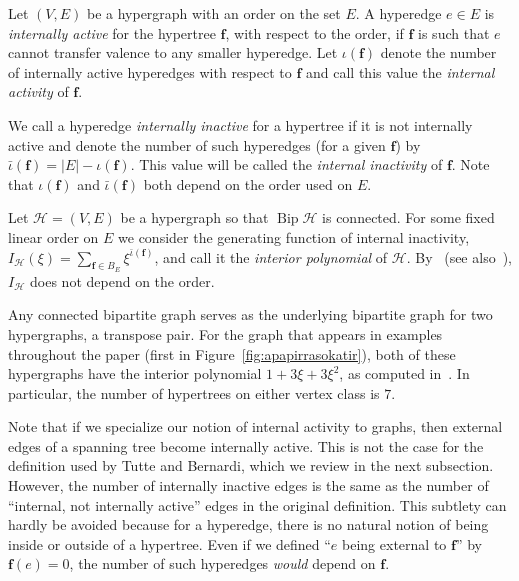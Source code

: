 \documentclass[ALCO,ThmDefs,Unicode,epreuves]{cedram}
\newcommand{\HH}{\mathcal H}
\DeclareMathOperator{\bip}{Bip}
\begin{document}
\begin{defi}
\label{def:activity}
Let $(V,E)$ be a hypergraph with an order on the set $E$. A hyperedge $e\in E$ is \emph{internally active} for the hypertree $\mathbf{f}$, with respect to the order, if $\mathbf f$ is such that $e$ cannot transfer valence to any smaller hyperedge. Let $\iota(\mathbf{f})$ denote the number of internally active hyperedges with respect to $\mathbf{f}$ and call this value the \emph{internal activity} of $\mathbf f$. 
\end{defi}

We call a hyperedge \emph{internally inactive} for a hypertree if it is not internally active and denote the number of such hyperedges (for a given $\mathbf{f}$) by $\bar\iota(\mathbf{f})=|E|-\iota(\mathbf{f})$. This value will be called the \emph{internal inactivity} of $\mathbf{f}$. Note that $\iota(\mathbf{f})$ and $\bar\iota(\mathbf{f})$ both depend on the order used on $E$.

\begin{defi}
\label{def:I}
Let $\HH=(V,E)$ be a hypergraph so that $\bip\HH$ is connected. For some fixed linear order on $E$ we consider the generating function of internal inactivity, $I_\HH(\xi)=\sum_{\mathbf{f}\in B_{E}} \xi^{\bar\iota(\mathbf{f})}$, and call it the \emph{interior polynomial} of $\HH$. By~\cite[Theorem~5.4]{hiperTutte} (see also~\cite[Subsection~2.2]{KP_Ehrhart}), $I_\HH$ does not depend on the order.
\end{defi}

\begin{exam}
Any connected bipartite graph serves as the underlying bipartite graph for two hypergraphs, a transpose pair. For the graph that appears in examples throughout the paper (first in Figure~\ref{fig:apapirrasokatir}), both of these hypergraphs have the interior polynomial $1+3\xi+3\xi^2$, as computed in~\cite[Example~5.6]{hiperTutte}. In particular, the number of hypertrees on either vertex class is $7$.
\end{exam}

Note that if we specialize our notion of internal activity to graphs, then external edges of a spanning tree become internally active. This is not the case for the definition used by Tutte and Bernardi, which we review in the next subsection. However, the number of internally inactive edges is the same as the number of ``internal, not internally active'' edges in the original definition. This subtlety can hardly be avoided because for a hyperedge, there is no natural notion of being inside or outside of a hypertree. Even if we defined ``$e$ being external to $\mathbf f$'' by $\mathbf f(e)=0$, the number of such hyperedges \emph{would} depend on $\mathbf f$.
\end{document}
